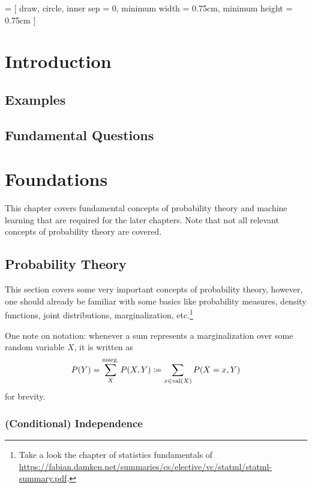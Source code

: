  = [
	draw,
	circle,
	inner sep = 0,
	minimum width = 0.75cm,
	minimum height = 0.75cm
]

\chapter{Introduction} %

	\section{Examples} %

	\section{Fundamental Questions} %

\chapter{Foundations}
	This chapter covers fundamental concepts of probability theory and machine learning that are required for the later chapters. Note that not all relevant concepts of probability theory are covered.

	\section{Probability Theory}
		This section covers some very important concepts of probability theory, however, one should already be familiar with some basics like probability measures, density functions, joint distributions, marginalization, etc.\footnote{Take a look the chapter of statistics fundamentals of \url{https://fabian.damken.net/summaries/cs/elective/vc/statml/statml-summary.pdf}.}

		One note on notation: whenever a sum represents a marginalization over some random variable \(X\), it is written as
		\begin{equation}
		P(Y) = \sum_{X}^{\operatorname{marg.}} P(X, Y) \coloneqq \sum_{x \in \operatorname{val}(X)} P(X = x, Y)
		\end{equation}
		for brevity.

		\subsection{(Conditional) Independence}
			\label{subsec:condIndependence}

